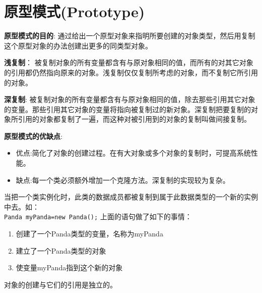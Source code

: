\documentclass[../main.tex]{subfiles}
\begin{document}
\section{原型模式(Prototype)}
\noindent \textbf{原型模式的目的}:
通过给出一个原型对象来指明所要创建的对象类型，然后用复制这个原型对象的办法创建出更多的同类型对象。

\textbf{浅复制}：
被复制对象的所有变量都含有与原对象相同的值，而所有的对其它对象的引用都仍然指向原来的对象。浅复制仅仅复制所考虑的对象，而不复制它所引用的对象。

\textbf{深复制}:
被复制对象的所有变量都含有与原对象相同的值，除去那些引用其它对象的变量。那些引用其它对象的变量将指向被复制过的新对象。深复制把要复制的对象所引用的对象都复制了一遍，而这种对被引用到的对象的复制叫做间接复制。

\textbf{原型模式的优缺点}:
\begin{itemize}
  \item 优点:简化了对象的创建过程。在有大对象或多个对象的复制时，可提高系统性能。
  \item 缺点:每一个类必须额外增加一个克隆方法。深复制的实现较为复杂。
\end{itemize}
%
当把一个类实例化时，此类的数据成员都被复制到属于此数据类型的一个新的实例中去。如： \\
\texttt{Panda myPanda=new Panda();}
上面的语句做了如下的事情：
\begin{enumerate}
  \item 创建了一个Panda类型的变量，名称为myPanda
  \item 建立了一个Panda类型的对象
  \item 使变量myPanda指到这个新的对象
\end{enumerate}
对象的创建与它们的引用是独立的。
\end{document}
